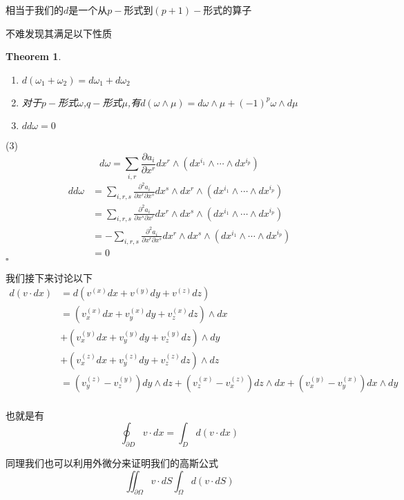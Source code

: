 \documentclass[11pt,hyperref,a4paper,UTF8]{ctexart}
\newtheorem{theorem}{Theorem}[subsection]
\newenvironment{cproof}{%
\heiti{证明}\kaishu
}{%
  \hfill $\square$
  \par\bigskip
}
\begin{document}
\begin{CJK}{UTF8}{gkai}
相当于我们的$d$是一个从$p-$形式到$(p + 1)-$形式的算子

不难发现其满足以下性质
\begin{theorem}
  \begin{enumerate}
    \item $d(\omega_1 + \omega_2) = d\omega_1 + d\omega_2$
    \item 对于$p-$形式$\omega$,$q-$形式$\mu$,有$d(\omega \wedge \mu) = d\omega \wedge \mu + (-1)^p \omega \wedge d \mu$
    \item $dd \omega = 0$
  \end{enumerate}
\end{theorem}

\begin{cproof}
  (3)
  \[d\omega = \sum_{i,r} \frac{\partial a_i}{\partial x^r} dx^r \wedge (dx^{i_1} \wedge \cdots \wedge dx^{i_p})\]
  \[
  \begin{aligned}
    dd \omega &= \sum_{i,r,s} \frac{\partial^2 a_i}{\partial x^r \partial x^s} dx^s \wedge dx^r \wedge (dx^{i_1} \wedge \cdots \wedge dx^{i_p})\\
    &= \sum_{i,r,s} \frac{\partial^2 a_i}{\partial x^s \partial x^r} dx^r \wedge dx^s \wedge (dx^{i_1} \wedge \cdots \wedge dx^{i_p})\\
    &= - \sum_{i,r,s} \frac{\partial^2 a_i}{\partial x^r \partial x^s} dx^r \wedge dx^s \wedge (dx^{i_1} \wedge \cdots \wedge dx^{i_p})\\
    &= 0
    \end{aligned}
  \]
\end{cproof}


我们接下来讨论以下
\[\begin{aligned}
  d(v\cdot dx) &= d(v^{(x)} dx + v^{(y)} dy + v^{(z)} dz)\\
  &= (v^{(x)}_x dx + v^{(x)}_y dy + v^{(x)}_z dz) \wedge dx\\
  &+ (v^{(y)}_x dx + v^{(y)}_y dy + v^{(y)}_z dz) \wedge dy\\
  &+ (v^{(z)}_x dx + v^{(z)}_y dy + v^{(z)}_z dz)\wedge dz\\
  &= (v_y^{(z)} - v_z^{(y)}) dy\wedge dz + (v_z^{(x)} - v_x^{(z)}) dz \wedge dx + (v_x^{(y)} - v_y^{(x)}) dx \wedge dy\\
\end{aligned}\]

也就是有
\[\oint_{\partial D} v\cdot dx = \int_D d(v\cdot dx)\]

同理我们也可以利用外微分来证明我们的高斯公式
\[\iint_{\partial \Omega} v\cdot dS \int_\Omega d(v\cdot dS)\]


\end{CJK}
\end{document}
